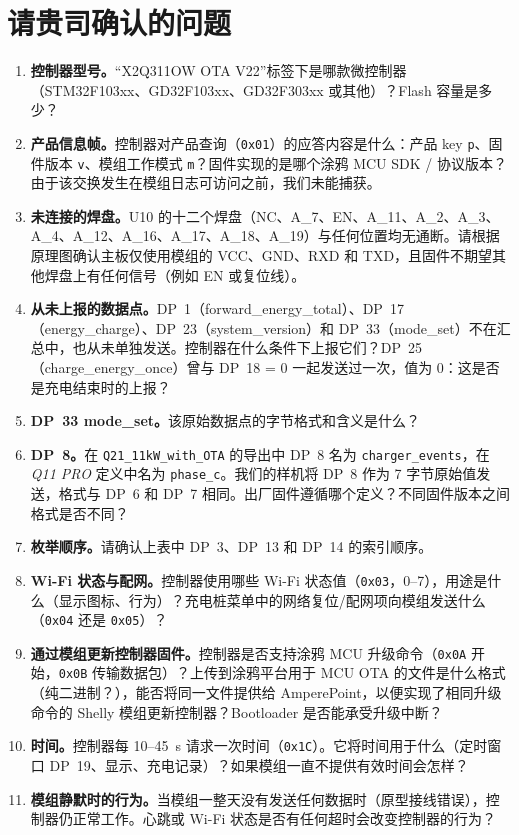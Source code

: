 \documentclass[11pt,a4paper]{article}
\newcommand{\hx}[1]{\texttt{#1}}
\begin{document}
\section{请贵司确认的问题}

\begin{enumerate}
\item \textbf{控制器型号。}“X2Q311OW OTA V22”标签下是哪款微控制器（STM32F103xx、GD32F103xx、GD32F303xx 或其他）？Flash 容量是多少？
\item \textbf{产品信息帧。}控制器对产品查询（\hx{0x01}）的应答内容是什么：产品 key \texttt{p}、固件版本 \texttt{v}、模组工作模式 \texttt{m}？固件实现的是哪个涂鸦 MCU SDK / 协议版本？由于该交换发生在模组日志可访问之前，我们未能捕获。
\item \textbf{未连接的焊盘。}U10 的十二个焊盘（NC、A\_7、EN、A\_11、A\_2、A\_3、A\_4、A\_12、A\_16、A\_17、A\_18、A\_19）与任何位置均无通断。请根据原理图确认主板仅使用模组的 VCC、GND、RXD 和 TXD，且固件不期望其他焊盘上有任何信号（例如 EN 或复位线）。
\item \textbf{从未上报的数据点。}DP~1（forward\_energy\_total）、DP~17（energy\_charge）、DP~23（system\_version）和 DP~33（mode\_set）不在汇总中，也从未单独发送。控制器在什么条件下上报它们？DP~25（charge\_energy\_once）曾与 DP~18 = 0 一起发送过一次，值为 0：这是否是充电结束时的上报？
\item \textbf{DP~33 mode\_set。}该原始数据点的字节格式和含义是什么？
\item \textbf{DP~8。}在 \texttt{Q21\_11kW\_with\_OTA} 的导出中 DP~8 名为 \texttt{charger\_events}，在 \emph{Q11 PRO} 定义中名为 \texttt{phase\_c}。我们的样机将 DP~8 作为 7 字节原始值发送，格式与 DP~6 和 DP~7 相同。出厂固件遵循哪个定义？不同固件版本之间格式是否不同？
\item \textbf{枚举顺序。}请确认上表中 DP~3、DP~13 和 DP~14 的索引顺序。
\item \textbf{Wi-Fi 状态与配网。}控制器使用哪些 Wi-Fi 状态值（\hx{0x03}，0--7），用途是什么（显示图标、行为）？充电桩菜单中的网络复位/配网项向模组发送什么（\hx{0x04} 还是 \hx{0x05}）？
\item \textbf{通过模组更新控制器固件。}控制器是否支持涂鸦 MCU 升级命令（\hx{0x0A} 开始，\hx{0x0B} 传输数据包）？上传到涂鸦平台用于 MCU OTA 的文件是什么格式（纯二进制？），能否将同一文件提供给 AmperePoint，以便实现了相同升级命令的 Shelly 模组更新控制器？Bootloader 是否能承受升级中断？
\item \textbf{时间。}控制器每 10--45~s 请求一次时间（\hx{0x1C}）。它将时间用于什么（定时窗口 DP~19、显示、充电记录）？如果模组一直不提供有效时间会怎样？
\item \textbf{模组静默时的行为。}当模组一整天没有发送任何数据时（原型接线错误），控制器仍正常工作。心跳或 Wi-Fi 状态是否有任何超时会改变控制器的行为？
\end{enumerate}
\end{document}
